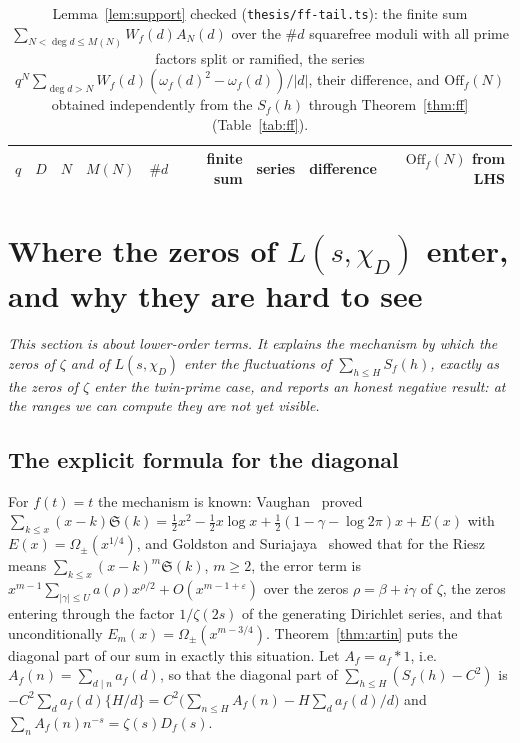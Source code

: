 \documentclass[11pt,a4paper]{article}
\theoremstyle{remark}\newtheorem{remark}[theorem]{Remark}
\newcommand{\Sig}{\mathfrak S}
\begin{document}
\begin{table}[htbp]
\centering\footnotesize\setlength{\tabcolsep}{5pt}
\caption{Lemma~\ref{lem:support} checked (\texttt{thesis/ff-tail.ts}): the finite sum
$\sum_{N<\deg d\le M(N)}W_f(d)A_N(d)$ over the $\#d$ squarefree moduli with all prime factors split or
ramified, the series $q^N\sum_{\deg d>N}W_f(d)(\omega_f(d)^2-\omega_f(d))/|d|$, their difference, and
$\mathrm{Off}_f(N)$ obtained independently from the $S_f(h)$ through Theorem~\ref{thm:ff}
(Table~\ref{tab:ff}).}\label{tab:fftail}
\begin{tabular}{rlrrrrrrr}
\toprule
$q$ & $D$ & $N$ & $M(N)$ & $\#d$ & finite sum & series & difference & $\mathrm{Off}_f(N)$ from LHS\\
\midrule

\end{tabular}
\end{table}

\FloatBarrier
\section{Where the zeros of $L(s,\chi_D)$ enter, and why they are hard to see}\label{sec:riesz}

\emph{This section is about lower-order terms. It explains the mechanism by which the zeros of $\zeta$
and of $L(s,\chi_D)$ enter the fluctuations of $\sum_{h\le H}S_f(h)$, exactly as the zeros of $\zeta$ enter
the twin-prime case, and reports an honest negative result: at the ranges we can compute they are not
yet visible.}

\subsection{The explicit formula for the diagonal}

For $f(t)=t$ the mechanism is known: Vaughan~\cite{Vaughan2001} proved
$\sum_{k\le x}(x-k)\Sig(k)=\tfrac12x^2-\tfrac12x\log x+\tfrac12(1-\gamma-\log2\pi)x+E(x)$ with
$E(x)=\Omega_\pm(x^{1/4})$, and Goldston and Suriajaya~\cite{GoldstonSuriajaya2021} showed that for the
Riesz means $\sum_{k\le x}(x-k)^m\Sig(k)$, $m\ge2$, the error term is
$x^{m-1}\sum_{|\gamma|\le U}a(\rho)x^{\rho/2}+O(x^{m-1+\varepsilon})$ over the zeros $\rho=\beta+i\gamma$ of
$\zeta$, the zeros entering through the factor $1/\zeta(2s)$ of the generating Dirichlet series, and that
unconditionally $E_m(x)=\Omega_\pm(x^{m-3/4})$. Theorem~\ref{thm:artin} puts the diagonal part of our
sum in exactly this situation. Let $A_f=a_f*1$, i.e.\ $A_f(n)=\sum_{d\mid n}a_f(d)$, so that the diagonal
part of $\sum_{h\le H}(S_f(h)-C^2)$ is $-C^2\sum_da_f(d)\{H/d\}=C^2\bigl(\sum_{n\le H}A_f(n)-H\sum_da_f(d)/d\bigr)$
and $\sum_nA_f(n)n^{-s}=\zeta(s)D_f(s)$.
\end{document}
